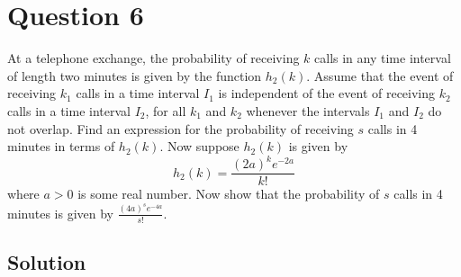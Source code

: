 \section*{Question 6}

At a telephone exchange, the probability of receiving \(k\) calls in any time interval of length two minutes is given by the function \(h_2(k)\).
Assume that the event of receiving \(k_1\) calls in a time interval \(I_1\) is independent of the event of receiving \(k_2\) calls in a time interval \(I_2\), for all \(k_1\) and \(k_2\) whenever the intervals \(I_1\) and \(I_2\) do not overlap.
Find an expression for the probability of receiving \(s\) calls in 4 minutes in terms of \(h_2(k)\).
Now suppose \(h_2(k)\) is given by
\[
    h_2(k) = \frac{{(2a)}^k e^{-2a}}{k!}
\]
where \(a > 0\) is some real number.
Now show that the probability of \(s\) calls in 4 minutes is given by \( \frac{(4a)^s e^{-4a}}{s!} \).

\subsection*{Solution}
